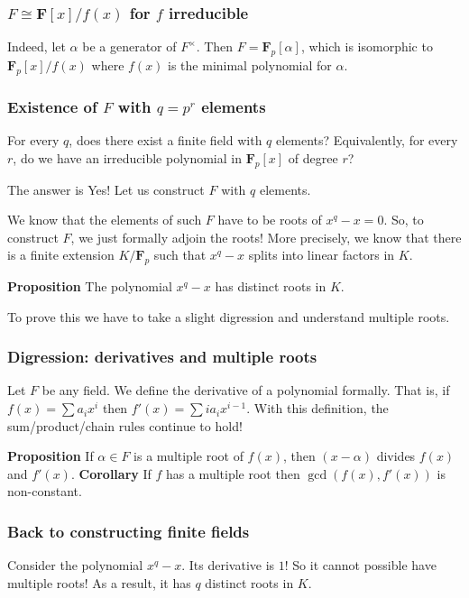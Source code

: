 \documentclass[11pt]{article}
\begin{document}
\subsubsection{\(F \cong \mathbf{F}[x]/f(x)\) for \(f\) irreducible}
\label{sec:orgab11b96}
Indeed, let \(\alpha\) be a generator of \(F^{\times}\).
Then \(F = \mathbf{F}_p[\alpha]\), which is isomorphic to \(\mathbf{F}_p[x]/f(x)\) where \(f(x)\) is the minimal polynomial for \(\alpha\).
\subsubsection{Existence of \(F\) with \(q = p^{r}\) elements}
\label{sec:orgc5ad948}
For every \(q\), does there exist a finite field with \(q\) elements?
Equivalently, for every \(r\), do we have an irreducible polynomial in \(\mathbf{F}_p[x]\) of degree \(r\)?

The answer is Yes!
Let us construct \(F\) with \(q\) elements.

We know that the elements of such \(F\) have to be roots of \(x^q-x = 0\).
So, to construct \(F\), we just formally adjoin the roots!
More precisely, we know that there is a finite extension \(K / \mathbf{F}_p\) such that \(x^q-x\) splits into linear factors in \(K\).

\textbf{\textbf{Proposition}} The polynomial \(x^q-x\) has distinct roots in \(K\).

To prove this we have to take a slight digression and understand multiple roots.
\subsubsection{Digression: derivatives and multiple roots}
\label{sec:orgaf00d4e}
Let \(F\) be any field.
We define the derivative of a polynomial formally.
That is, if \(f(x) = \sum a_i x^{i}\) then \(f'(x) = \sum i a_i x^{i-1}.\)
With this definition, the sum/product/chain rules continue to hold!

\textbf{\textbf{Proposition}} If \(\alpha \in F\) is a multiple root of \(f(x)\), then \((x-\alpha)\) divides \(f(x)\) and \(f'(x)\).
\textbf{\textbf{Corollary}} If \(f\) has a multiple root then \(\gcd(f(x), f'(x))\) is non-constant.
\subsubsection{Back to constructing finite fields}
\label{sec:org3c07fa7}
Consider the polynomial \(x^q - x\).
Its derivative is \(1\)!
So it cannot possible have multiple roots!
As a result, it has \(q\) distinct roots in \(K\).
\end{document}
